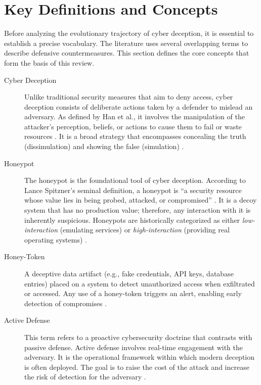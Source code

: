 \section{Key Definitions and Concepts}

Before analyzing the evolutionary trajectory of cyber deception, it is essential to
establish a precise vocabulary. The literature uses several overlapping terms to
describe defensive countermeasures. This section defines the core concepts that form
the basis of this review.

\begin{description}

      \item[Cyber Deception]
            Unlike traditional security measures that aim to deny access, cyber deception
            consists of deliberate actions taken by a defender to mislead an adversary.
            As defined by Han et al., it involves the manipulation of the attacker's
            perception, beliefs, or actions to cause them to fail or waste resources
            \cite{han2018deception}. It is a broad strategy that encompasses concealing
            the truth (dissimulation) and showing the false (simulation)
            \cite{rowe2016introduction,pawlick2019game}.


      \item[Honeypot]
            The honeypot is the foundational tool of cyber deception. According to Lance
            Spitzner's seminal definition, a honeypot is ``a security resource whose value
            lies in being probed, attacked, or compromised'' \cite{spitzner2002honeypots}.
            It is a decoy system that has no production value; therefore, any interaction
            with it is inherently suspicious. Honeypots are historically categorized as
            either \textit{low-interaction} (emulating services) or \textit{high-interaction}
            (providing real operating systems) \cite{provos2004virtual,nawrocki2016survey}.

      \item[Honey-Token]
            A deceptive data artifact (e.g., fake credentials, API keys, database entries)
            placed on a system to detect unauthorized access when exfiltrated or accessed.
            Any use of a honey-token triggers an alert, enabling early detection of
            compromises \cite{nawrocki2016survey}.


      \item[Active Defense]
            This term refers to a proactive cybersecurity doctrine that contrasts with
            passive defense. Active defense involves real-time engagement with the adversary.
            It is the operational framework within which modern deception is often deployed.
            The goal is to raise the cost of the attack and increase the risk of detection
            for the adversary \cite{jajodia2011moving}.



\end{description}
